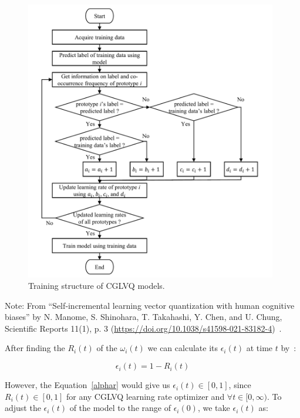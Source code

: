 \begin{figure}[H]
    \centering
    \includegraphics[width=0.98\textwidth]{images/lr flowchart.png}
    \caption{Training structure of CGLVQ models.}
    \label{flowchart}
\end{figure}

\noindent Note: From “Self‑incremental learning vector
quantization with human cognitive
biases” by N. Manome, S. Shinohara, T. Takahashi, Y. Chen, and U. Chung, Scientific Reports 11(1), p. 3 (\url{https://doi.org/10.1038/s41598-021-83182-4})~\cite{lrimp}.
\vspace{10pt}

After finding the $R_{i}(t)$ of the $\omega_{i}(t)$ we can calculate its $\epsilon_{i}(t)$ at time $t$ by~\cite{lrimp}:

\begin{equation}
\epsilon_{i}(t) = 1 - R_{i}(t)\label{alphar}
\end{equation}

However, the Equation~\eqref{alphar} would give us $\epsilon_{i}(t) \in [0,1]$, since $R_{i}(t) \in [0,1]$ for any CGLVQ learning rate optimizer and $\forall t \in [0,\infty)$. To adjust the $\epsilon_{i}(t)$ of the model to the range of $\epsilon_{i}(0)$, we take $\epsilon_{i}(t)$ as:

